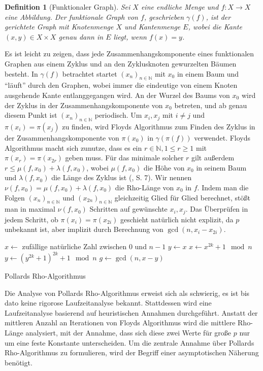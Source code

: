 \documentclass[a4paper, 10pt, ngerman]{article}
\newcommand{\N}{\mathbb{N}}
\newtheorem{definition}{Definition}
\begin{document}
\begin{definition}[Funktionaler Graph]
    Sei $X$ eine endliche Menge und $f: X \to X$ eine Abbildung. Der funktionale Graph von $f$, geschrieben $\gamma(f)$, ist der gerichtete Graph mit Knotenmenge $X$ und Kantenmenge $E$, wobei die Kante $(x, y) \in X \times X$ genau dann in $E$ liegt, wenn $f(x) = y$.
\end{definition}

\noindent Es ist leicht zu zeigen, dass jede Zusammenhangskomponente eines funktionalen Graphen aus einem Zyklus und an den Zyklusknoten gewurzelten Bäumen besteht. In $\gamma(f)$ betrachtet startet $(x_n)_{n \in \N}$ mit $x_0$ in einem Baum und "`läuft"' durch den Graphen, wobei immer die eindeutige von einem Knoten ausgehende Kante entlanggegangen wird. An der Wurzel des Baums von $x_0$ wird der Zyklus in der Zusammenhangskomponente von $x_0$ betreten, und ab genau diesem Punkt ist $(x_n)_{n \in \N}$ periodisch. Um $x_i, x_j$ mit $i \ne j$ und $\pi(x_i) = \pi(x_j)$ zu finden, wird Floyds Algorithmus zum Finden des Zyklus in der Zusammenhangskomponente von $\pi(x_0)$ in $\gamma(\pi(f))$ verwendet. Floyds Algorithmus macht sich zunutze, dass es ein $r \in \N, 1 \le r \ge 1$ mit $\pi(x_r) = \pi(x_{2r})$ geben muss. Für das minimale solcher $r$ gilt außerdem $r \le \mu(f, x_0) + \lambda(f, x_0)$, wobei $\mu(f, x_0)$ die Höhe von $x_0$ in seinem Baum und $\lambda(f, x_0)$ die Länge des Zyklus ist (\cite{knu98}, S. 7). Wir nennen $\nu(f, x_0) = \mu(f, x_0) + \lambda(f, x_0)$ die Rho-Länge von $x_0$ in $f$. Indem man die Folgen $(x_n)_{n \in \N}$ und $(x_{2n})_{n \in \N}$ gleichzeitig Glied für Glied berechnet, stößt man in maximal $\nu(f, x_0)$ Schritten auf gewünschte $x_i, x_j$. Das Überprüfen in jedem Schritt, ob $\pi(x_i) = \pi(x_{2i})$ geschieht natürlich nicht explizit, da $p$ unbekannt ist, aber implizit durch Berechnung von $\gcd(n, x_i - x_{2i})$.

\begin{algorithm*}
    $x \gets $ zufällige natürliche Zahl zwischen $0$ und $n - 1$ \;
    $y \gets x$ \;
    {
        $x \gets x^{2k} + 1 \mod n$ \;
        $y \gets (y^{2k} + 1)^{2k} + 1 \mod n$ \;
        $g \gets \gcd(n, x - y)$ \;
        {
             \;
        }
    }

    \caption{Pollards Rho-Algorithmus}
\end{algorithm*}

\noindent Die Analyse von Pollards Rho-Algorithmus erweist sich als schwierig, es ist bis dato keine rigorose Laufzeitanalyse bekannt. Stattdessen wird eine Laufzeitanalyse basierend auf heuristischen Annahmen durchgeführt. Anstatt der mittleren Anzahl an Iterationen von Floyds Algorithmus wird die mittlere Rho-Länge analysiert, mit der Annahme, dass sich diese zwei Werte für große $p$ nur um eine feste Konstante unterscheiden. Um die zentrale Annahme über Pollards Rho-Algorithmus zu formulieren, wird der Begriff einer asymptotischen Näherung benötigt.
\end{document}

